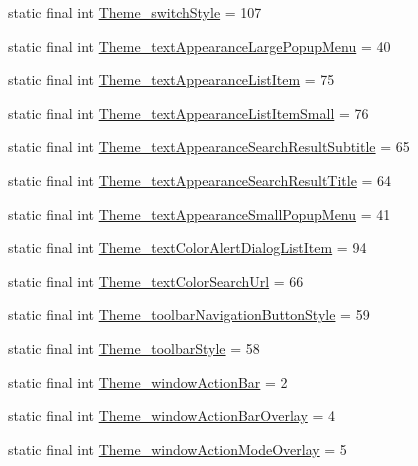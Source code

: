 \begin{DoxyCompactItemize}
\item 
static final int \hyperlink{classcheck_1_1test_1_1_r_1_1styleable_a2816120337bd94eb4728d7a72ace5ce4}{Theme\+\_\+switch\+Style} = 107
\item 
static final int \hyperlink{classcheck_1_1test_1_1_r_1_1styleable_a3c2ff2e7da8190569961b889ced77fcd}{Theme\+\_\+text\+Appearance\+Large\+Popup\+Menu} = 40
\item 
static final int \hyperlink{classcheck_1_1test_1_1_r_1_1styleable_a1a1b8a87f2acabee24a7e564989bfbe3}{Theme\+\_\+text\+Appearance\+List\+Item} = 75
\item 
static final int \hyperlink{classcheck_1_1test_1_1_r_1_1styleable_abe557b2f9da24355df498eac97be2c53}{Theme\+\_\+text\+Appearance\+List\+Item\+Small} = 76
\item 
static final int \hyperlink{classcheck_1_1test_1_1_r_1_1styleable_a1d39c6b5da48087c8f55a027e4050139}{Theme\+\_\+text\+Appearance\+Search\+Result\+Subtitle} = 65
\item 
static final int \hyperlink{classcheck_1_1test_1_1_r_1_1styleable_aad7da0b4a2302f6cd5981784f6507c2d}{Theme\+\_\+text\+Appearance\+Search\+Result\+Title} = 64
\item 
static final int \hyperlink{classcheck_1_1test_1_1_r_1_1styleable_a5d74a42ce30244146c66202e8a63600e}{Theme\+\_\+text\+Appearance\+Small\+Popup\+Menu} = 41
\item 
static final int \hyperlink{classcheck_1_1test_1_1_r_1_1styleable_a1c80e17e0c7244efe703fdaec5710c66}{Theme\+\_\+text\+Color\+Alert\+Dialog\+List\+Item} = 94
\item 
static final int \hyperlink{classcheck_1_1test_1_1_r_1_1styleable_ac9bde1fe29dd51a5aa9486cce5dc77cd}{Theme\+\_\+text\+Color\+Search\+Url} = 66
\item 
static final int \hyperlink{classcheck_1_1test_1_1_r_1_1styleable_a17c17271f93cd157c12fec0dd05f41e2}{Theme\+\_\+toolbar\+Navigation\+Button\+Style} = 59
\item 
static final int \hyperlink{classcheck_1_1test_1_1_r_1_1styleable_a3e0a6d9c5645dc0e8bc6e32efbf36b28}{Theme\+\_\+toolbar\+Style} = 58
\item 
static final int \hyperlink{classcheck_1_1test_1_1_r_1_1styleable_adc8b4e64798d8c55e475a6440a5c6aac}{Theme\+\_\+window\+Action\+Bar} = 2
\item 
static final int \hyperlink{classcheck_1_1test_1_1_r_1_1styleable_adc29b18d7459f89f6028a65608a1e6c8}{Theme\+\_\+window\+Action\+Bar\+Overlay} = 4
\item 
static final int \hyperlink{classcheck_1_1test_1_1_r_1_1styleable_a5abe584f47941f3243c037bca83f20fd}{Theme\+\_\+window\+Action\+Mode\+Overlay} = 5

\end{DoxyCompactItemize}
